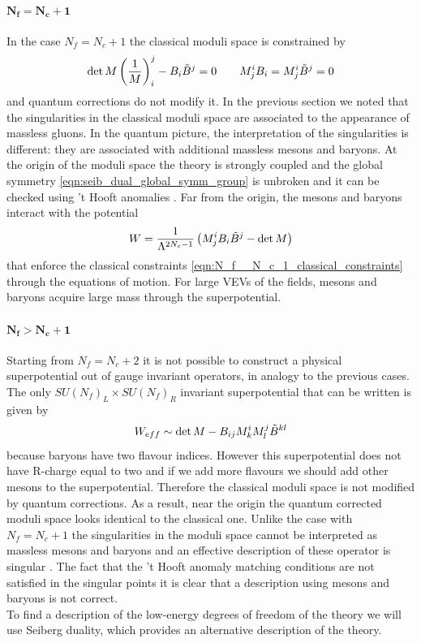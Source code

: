 \paragraph{$\mathbf{N_f = N_c +1}$}
In the case $N_f = N_c +1 $ the classical moduli space is constrained by
\begin{equation}
 \mathrm{det } \,{M} \left( \frac{1}{M}\right)^j_i - B_i \tilde{B}^j = 0 \qquad
 M^i_j B_i = M^i_j \tilde{B}^j = 0 
 \label{eqn:N_f__N_c_1_classical_constraints}
\end{equation}
and quantum corrections do not modify it.
In the previous section we noted that the singularities in the classical moduli space are associated to the appearance of massless gluons.
In the quantum picture, the interpretation of the singularities is different: they are associated with additional massless mesons and baryons.
At the origin of the moduli space the theory is strongly coupled and the global symmetry \eqref{eqn:seib_dual_global_symm_group} is unbroken and it can be checked using 't Hooft anomalies \cite{Seiberg:1994bz}.
Far from the origin, the mesons and baryons interact with the potential 
\begin{equation}
W = \frac{1}{\Lambda^{2 N_c -1}} \left( M^i_j B_i \tilde{B}^j - \mathrm{det } \,{M} \right)
\end{equation}
that enforce the classical constraints \eqref{eqn:N_f__N_c_1_classical_constraints} through the equations of motion.
For large VEVs of the fields, mesons and baryons acquire large mass through the superpotential.
\paragraph{$\mathbf{ N_f > N_c +1 }$}
Starting from $N_f = N_c +2$ it is not possible to construct a physical superpotential out of gauge invariant operators, in analogy to the previous cases.
The only $SU(N_f)_L \times SU(N_f)_R$ invariant superpotential that can be written is given by
\begin{equation}
 W_{eff} \sim \mathrm{det } \,{M} - B_{ij} M^i_k M^j_l \tilde{B}^{kl} 
 \end{equation} 
because baryons have two flavour indices.
However this superpotential does not have R-charge equal to two and if we add more flavours we should add other mesons to the superpotential. Therefore the classical moduli space is not modified by quantum corrections.
As a result, near the origin the quantum corrected moduli space looks identical to the classical one.
Unlike the case with $N_f = N_c +1$ the singularities in the moduli space cannot be interpreted as massless mesons and baryons and an effective description of these operator is singular \cite{Seiberg:1994bz}.
The fact that the 't Hooft anomaly matching conditions are not satisfied in the singular points it is clear that a description using mesons and baryons is not correct.
\\
To find a description of the low-energy degrees of freedom of the theory we will use Seiberg duality, which provides an alternative description of the theory.

